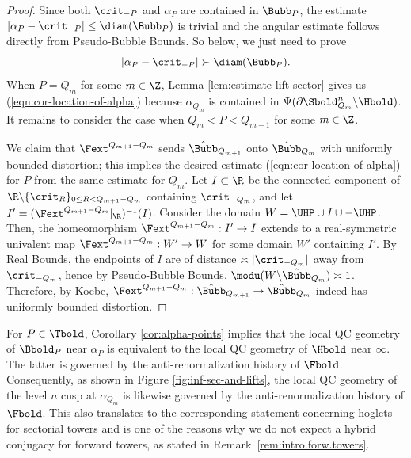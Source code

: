 \documentclass{amsart}
\begin{document}
\begin{proof}
    Since both $\crit_{-P}$ and $\alpha_P$ are contained in $\Bubb_P$, the estimate $|\alpha_P - \crit_{-P}| \leq \diam(\Bubb_P)$ is trivial and the angular estimate follows directly from Pseudo-Bubble Bounds. So below, we just need to prove 
    \begin{equation}
    \label{eqn:cor-location-of-alpha}
    |\alpha_P - \crit_{-P}| \succ \diam(\Bubb_P).
    \end{equation}
    When $P = Q_m$ for some $m \in \Z$, Lemma \ref{lem:estimate-lift-sector} gives us (\ref{eqn:cor-location-of-alpha}) because $\alpha_{Q_m}$ is contained in $\Psi(\partial \Sbold^n_{Q_m} \backslash \Hbold )$.
    It remains to consider the case when $Q_m < P < Q_{m+1}$ for some $m \in \Z$.
    
    We claim that $\Fext^{Q_{m+1}-Q_m}$ sends $\hat{\Bubb}_{Q_{m+1}}$ onto $\hat{\Bubb}_{Q_m}$ with uniformly bounded distortion; this implies the desired estimate (\ref{eqn:cor-location-of-alpha}) for $P$ from the same estimate for $Q_m$.
    Let $I \subset \R$ be the connected component of $\R \backslash \{\crit_{R}\}_{0\leq R < Q_{m+1}-Q_m}$ containing $\crit_{-Q_m}$, and let $I' = (\Fext^{Q_{m+1}-Q_m}|_{\R})^{-1}(I)$.
    Consider the domain $W = \UHP \cup I \cup -\UHP$.
    Then, the homeomorphism $\Fext^{Q_{m+1}-Q_m}: I' \to I$ extends to a real-symmetric univalent map $\Fext^{Q_{m+1}-Q_m}: W' \to W$ for some domain $W'$ containing $I'$.
    By Real Bounds, the endpoints of $I$ are of distance $\asymp |\crit_{-Q_m}|$ away from $\crit_{-Q_m}$, hence by Pseudo-Bubble Bounds, $\modu(W \backslash \hat{\Bubb}_{Q_m}) \asymp 1$.
    Therefore, by Koebe, $\Fext^{Q_{m+1}-Q_m}: \hat{\Bubb}_{Q_{m+1}} \to \hat{\Bubb}_{Q_{m}}$ indeed has uniformly bounded distortion. 
\end{proof}

\begin{remark}
\label{rem:anti.renorm.history} 
For $P \in \Tbold$, Corollary \ref{cor:alpha-points} implies that the local QC geometry of $\Bbold_{P}$ near $\alpha_P$ is equivalent to the local QC geometry of $\Hbold$ near $\infty$. The latter is governed by the anti-renormalization history of $\Fbold$. Consequently, as shown in Figure \ref{fig:inf-sec-and-lifts}, the local QC geometry of the level $n$ cusp at $\alpha_{Q_{m}}$ is likewise governed by the anti-renormalization history of $\Fbold$. This also translates to the corresponding statement concerning hoglets for sectorial towers and is one of the reasons why we do not expect a hybrid conjugacy for forward towers, as stated in Remark~\ref{rem:intro.forw.towers}.
\end{remark}
\end{document}
